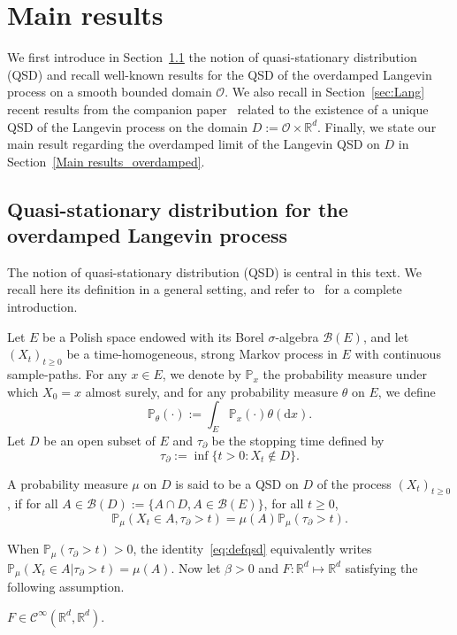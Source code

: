 \documentclass[preprint,EJP]{ejpecp}
\begin{document}
\section{Main results}\label{sec: main results qsd}  

We first introduce in Section~\ref{sec:OL} the notion of quasi-stationary distribution (QSD) and recall well-known results for the QSD of the overdamped Langevin process on a smooth bounded domain $\mathcal{O}$. We also recall in Section~\ref{sec:Lang} recent results from the companion paper~\cite{LelRamRey2} related to the existence of a unique QSD of the Langevin process on the domain $D:=\mathcal{O}\times\mathbb{R}^d$. Finally, we state our main result regarding the overdamped limit of the Langevin QSD on $D$ in Section~\ref{Main results_overdamped}.

\subsection{Quasi-stationary distribution for the overdamped Langevin process} \label{sec:OL}
 The notion of quasi-stationary distribution (QSD) is central in this text. We recall here its definition in a general setting, and refer to~\cite{Collet,VilMel} for a complete introduction. 

Let $E$ be a Polish space endowed with its Borel $\sigma$-algebra $\mathcal{B}(E)$, and let $(X_t)_{t \geq 0}$ be a time-homogeneous, strong Markov process in $E$ with continuous sample-paths. For any $x \in E$, we denote by $\mathbb{P}_x$ the probability measure under which $X_0=x$ almost surely, and for any probability measure $\theta$ on $E$, we define
\begin{equation*}
  \mathbb{P}_\theta(\cdot) := \int_E \mathbb{P}_x(\cdot)\theta(\mathrm{d}x).
\end{equation*}
Let $D$ be an open subset of $E$ and $\tau_\partial$ be the stopping time defined by
\begin{equation*}
  \tau_\partial := \inf\{t>0: X_t \not\in D\}.
\end{equation*}

\begin{definition}[QSD]\label{def QSD 1} A probability measure $\mu$ on $D$ is said to be a QSD on $D$ of the process $(X_t)_{t\geq0}$, if for all $A\in\mathcal{B}(D) := \{A\cap D,A\in\mathcal{B}(E)\}$, for all $t\geq0$,
\begin{equation}\label{eq:defqsd}
  \mathbb{P}_\mu(X_t\in A, \tau_\partial>t)=\mu(A)\mathbb{P}_\mu(\tau_\partial>t).
\end{equation}
\end{definition} 
\noindent When $\mathbb{P}_\mu(\tau_\partial>t)>0$, the identity~\eqref{eq:defqsd} equivalently writes $\mathbb{P}_\mu(X_t\in A|\tau_\partial>t)=\mu(A)$. Now let $\beta>0$ and $F:\mathbb{R}^d\mapsto\mathbb{R}^d$ satisfying the following assumption. 
\begin{hypothesis}\label{hyp F1 qsd}
$F\in\mathcal{C}^\infty(\mathbb{R}^{d},\mathbb{R}^{d})$. \end{hypothesis}
\end{document}

